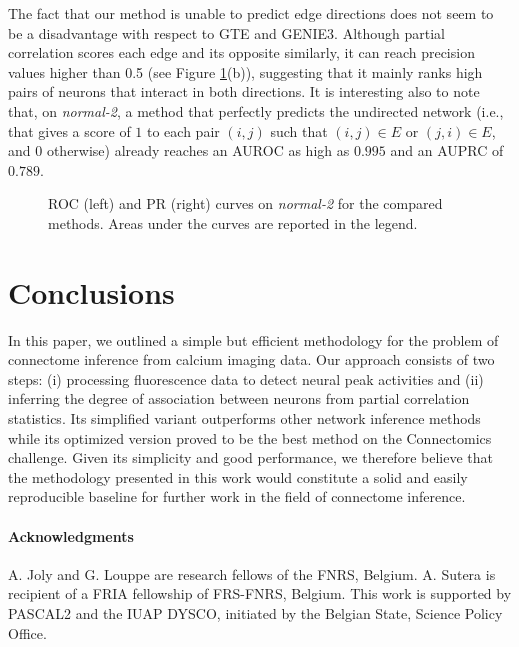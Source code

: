 \documentclass[wcp]{jmlr}
\begin{document}
The fact that our method is unable to predict edge directions does not seem to
be a disadvantage with respect to GTE and GENIE3. Although partial correlation
scores each edge and its opposite similarly, it can reach precision values
higher than 0.5 (see Figure \ref{fig:curves}(b)), suggesting that it mainly ranks high
pairs of neurons that interact in both directions.  It is interesting also to
note that, on \textit{normal-2}, a method that perfectly predicts the
undirected network (i.e., that gives a score of $1$ to each pair $(i,j)$ such that
$(i,j)\in E$ or $(j,i)\in E$, and $0$ otherwise) already reaches an AUROC as high
as $0.995$ and an AUPRC of $0.789$.

\begin{figure}[t]
\centering
{}
\caption{ROC (left) and PR (right) curves on \textit{normal-2} for the compared methods. Areas under the curves are reported in the legend.}

\label{fig:curves}
\end{figure}

\section{Conclusions} \label{sec:conclusion}

In this paper, we outlined a simple but efficient methodology for the problem
of connectome inference from calcium imaging data. Our approach consists of two
steps: (i) processing fluorescence data to detect neural peak activities and
(ii) inferring the degree of association between neurons from partial
correlation statistics. Its simplified variant outperforms other
network inference methods while its optimized version proved to be the best method
on the Connectomics challenge. Given its simplicity and good performance, we
therefore believe that the methodology presented in this work
would constitute a solid and easily reproducible baseline for further work in
the field of connectome inference.


\paragraph{Acknowledgments}
A. Joly and G. Louppe are research fellows of the FNRS, Belgium.  A. Sutera is
recipient of a FRIA fellowship of FRS-FNRS, Belgium. This work is supported by
PASCAL2 and the IUAP DYSCO, initiated by the Belgian State, Science Policy
Office.
\end{document}
